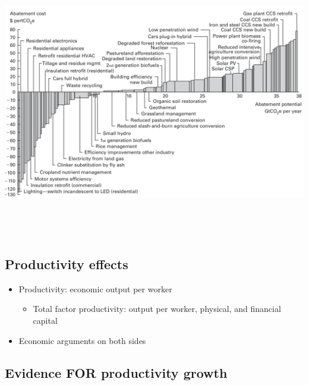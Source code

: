 \documentclass[
]{article}
\providecommand{\tightlist}{%
  \setlength{\itemsep}{0pt}\setlength{\parskip}{0pt}}
\begin{document}
\includegraphics[width=\textwidth,height=4.6875in]{figures/m7_carbon_abatement_cost.png}

\hypertarget{productivity-effects}{%
\subsection{Productivity effects}\label{productivity-effects}}

\begin{itemize}
\tightlist
\item
  Productivity: economic output per worker

  \begin{itemize}
  \tightlist
  \item
    Total factor productivity: output per worker, physical, and
    financial capital
  \end{itemize}
\item
  Economic arguments on both sides
\end{itemize}

\hypertarget{evidence-for-productivity-growth}{%
\subsection{Evidence FOR productivity
growth}\label{evidence-for-productivity-growth}}
\end{document}
